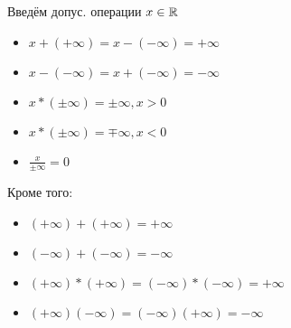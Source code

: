 Введём допус. операции $x \in \mathbb{R}$
\begin{itemize}
    \item $x + (+\infty) = x - (-\infty) = +\infty$
    \item $x - (-\infty) = x + (-\infty) = -\infty$
    \item $x * (\pm \infty) = \pm \infty, x > 0$
    \item $x * (\pm \infty) = \mp \infty, x < 0$
   \item $\frac{x}{\pm \infty} = 0$
\end{itemize}
Кроме того:
\begin{itemize}
    \item $(+\infty) + (+\infty) = +\infty$
    \item $(-\infty) + (-\infty) = -\infty$
    \item $(+\infty) * (+\infty) = (-\infty) * (-\infty) = +\infty$
    \item $(+\infty)(-\infty) = (-\infty)(+\infty) = -\infty$
\end{itemize}

